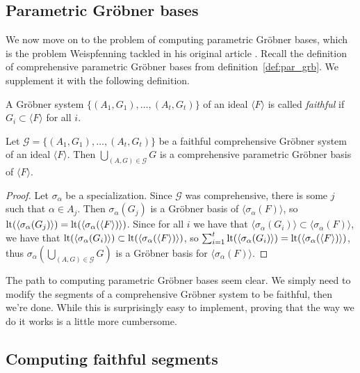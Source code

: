 \subsection{Parametric Gröbner bases}
We now move on to the problem of computing parametric Gröbner bases, which is the problem Weispfenning tackled in his original article \cite{Weispfenning}. Recall the definition of comprehensive parametric Gröbner bases from definition~\ref{def:par_grb}. We supplement it with the following definition.

\begin{definition}
  A Gröbner system $\{(A_{1}, G_{1}), \dots, (A_{t}, G_{t})\}$ of an ideal $\langle F \rangle$ is called \textit{faithful} if $G_{i} \subset \langle F \rangle$ for all $i$.
\end{definition}

\begin{corollary}\label{cor:faithful_cgs_to_cgb}
  Let $\mathcal G = \{(A_{1}, G_{1}), \dots, (A_{t}, G_{t})\}$ be a faithful comprehensive Gröbner system of an ideal $\langle F \rangle$. Then $\bigcup_{(A, G) \in \mathcal G} G$ is a comprehensive parametric Gröbner basis of $\langle F \rangle$.
\end{corollary}
\begin{proof}
  Let $\sigma_{\alpha}$ be a specialization. Since $\mathcal G$ was comprehensive, there is some $j$ such that $\alpha \in A_{j}$. Then $\sigma_{\alpha}(G_{j})$ is a Gröbner basis of $\langle \sigma_{\alpha}(F) \rangle$, so $\operatorname{lt}( \langle \sigma_{\alpha}(G_{j}) \rangle) = \operatorname{lt}( \langle \sigma_{\alpha}(\langle F \rangle) \rangle)$. Since for all $i$ we have that $\langle \sigma_{\alpha}(G_{i}) \rangle \subset \langle \sigma_{\alpha}(F) \rangle$, we have that $\operatorname{lt}( \langle \sigma_{\alpha}(G_{i}) \rangle ) \subset \operatorname{lt}( \langle \sigma_{\alpha}(\langle F \rangle) \rangle)$, so $\sum_{i=1}^{t} \operatorname{lt}( \langle \sigma_{\alpha}(G_{i}) \rangle) = \operatorname{lt}(\langle \sigma_{\alpha}(\langle F \rangle) \rangle )$, thus $\sigma_{\alpha}\left(\bigcup_{(A, G) \in \mathcal G} G\right)$ is a Gröbner basis for $\langle \sigma_{\alpha}(F) \rangle$.
\end{proof}

The path to computing parametric Gröbner bases seem clear. We simply need to modify the segments of a comprehensive Gröbner system to be faithful, then we're done. While this is surprisingly easy to implement, proving that the way we do it works is a little more cumbersome.

\subsection{Computing faithful segments}

